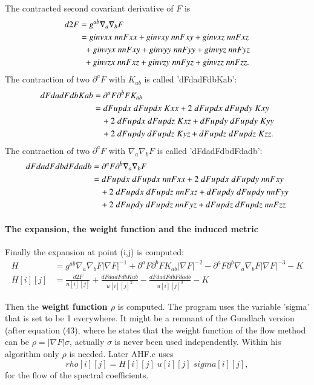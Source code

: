 \documentclass[11pt,a4paper,twoside]{article}
\begin{document}
The contracted second covariant derivative of $F$ is
\begin{align}
  d2F &=g^{ab} \nabla_a \nabla_b F \\
      &=ginvxx \;nnFxx + ginvxy \;nnFxy + ginvxz \;nnFxz \notag\\
      &\;\;+ ginvyx \;nnFxy + ginvyy \;nnFyy + ginvyz \;nnFyz\notag\\
      &\;\;+ ginvzx \;nnFxz + ginvzy \;nnFyz + ginvzz \;nnFzz.
\end{align}                    
The contraction of two $\partial^a F$ with $K_{ab}$ is called 'dFdadFdbKab':
\begin{align}
  dFdadFdbKab&=\partial^a F \partial^b F K_{ab}\\
     &=dFupdx\;dFupdx\;Kxx + 2\;dFupdx\;dFupdy\;Kxy \notag\\
     &\quad + 2\;dFupdx\;dFupdz\;Kxz + dFupdy\;dFupdy\;Kyy \notag\\
     &\quad + 2\;dFupdy\;dFupdz\;Kyz + dFupdz\;dFupdz\;Kzz.
\end{align}
The contraction of two $\partial^a F$ with $\nabla_a \nabla_b F$ is called 'dFdadFdbdFdadb':
\begin{align}
  dFdadFdbdFdadb&=\partial^a F \partial^b \nabla_a \nabla_b F\\
    &=dFupdx\;dFupdx\;nnFxx + 2\;dFupdx\;dFupdy\;nnFxy\notag\\
    &\quad+ 2\;dFupdx\;dFupdz\;nnFxz + dFupdy\;dFupdy\;nnFyy \notag\\
    &\quad+ 2\;dFupdy\;dFupdz\;nnFyz + dFupdz\;dFupdz\;nnFzz  
\end{align}

\paragraph{The expansion, the weight function and the induced metric}
Finally the expansion at point (i,j) is computed:
\begin{align}
  H &= g^{ab} \nabla_a \nabla_b F |\nabla F|^{-1} 
         + \partial^a F \partial^b F K_{ab} |\nabla F|^{-2}
         - \partial^a F \partial^b \nabla_a \nabla_b F |\nabla F|^{-3} -K\\
  H[i][j] &=  \frac {d2F}{u[i][j]} + \frac {dFdadFdbKab}{u[i][j]^2}
       -\frac {dFdadFdbFdadb}{u[i][j]^3} - K       
\end{align}

Then the \textbf{weight function $\rho$} is computed.
The program uses the variable 'sigma' that is set to be 1 
everywhere. It might be a remnant of the Gundlach version (after equation (43),
where he states that the weight function of the flow method can be $\rho= |\nabla F| \sigma$, 
actually $\sigma$ is never been used independently. 
Within his algorithm only $\rho$ is needed. Later AHF.c uses 
\begin{equation}
  \label{weightrho}
  rho[i][j] = H[i][j] \;u[i][j]\; sigma[i][j],
\end{equation}
for the flow of the spectral coefficients. 
\end{document}
